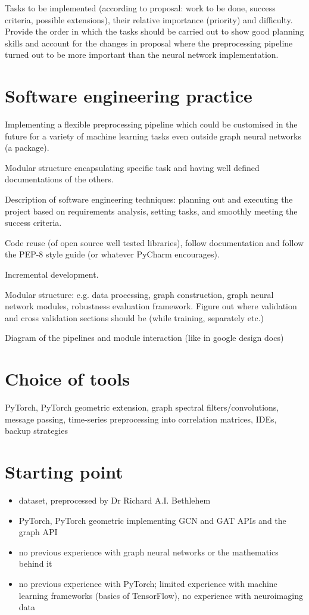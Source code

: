 Tasks to be implemented (according to proposal: work to be done, success criteria, possible extensions), their relative importance (priority) and difficulty. Provide the order in which the tasks should be carried out to show good planning skills and account for the changes in proposal where the preprocessing pipeline turned out to be more important than the neural network implementation.

\section{Software engineering practice}
Implementing a flexible preprocessing pipeline which could be customised in the future for a variety of machine learning tasks even outside graph neural networks (a package).

Modular structure encapsulating specific task and having well defined documentations of the others.

Description of software engineering techniques: planning out and executing the project based on requirements analysis, setting tasks, and smoothly meeting the success criteria.

Code reuse (of open source well tested libraries), follow documentation and follow the PEP-8 style guide (or whatever PyCharm encourages).

Incremental development.

Modular structure: e.g. data processing, graph construction, graph neural network modules, robustness evaluation framework. Figure out where validation and cross validation sections should be (while training, separately etc.)

Diagram of the pipelines and module interaction (like in google design docs)


\section{Choice of tools}
PyTorch, PyTorch geometric extension, graph spectral filters/convolutions, message passing, time-series preprocessing into correlation matrices, IDEs, backup strategies

\section{Starting point}
\begin{itemize}
    \item dataset, preprocessed by Dr Richard A.I. Bethlehem
    \item PyTorch, PyTorch geometric implementing GCN and GAT APIs and the graph API
    \item no previous experience with graph neural networks or the mathematics behind it
    \item no previous experience with PyTorch; limited experience with machine learning frameworks (basics of TensorFlow), no experience with neuroimaging data
\end{itemize}
